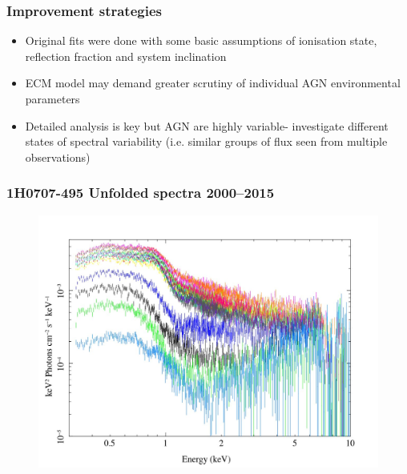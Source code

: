 \documentclass[]{beamer}
\begin{document}
\begin{frame}
\frametitle{Improvement strategies}
\begin{itemize}
    \item Original fits were done with some basic assumptions of ionisation state, reflection fraction and system inclination\pause
    \item ECM model may demand greater scrutiny of individual AGN environmental parameters\pause
    \item Detailed analysis is key but AGN are highly variable- investigate different states of spectral variability (i.e. similar groups of flux seen from multiple observations)
\end{itemize}
\end{frame}

\begin{frame}
\frametitle{1H0707-495 Unfolded spectra 2000--2015}
\begin{figure}\centering
\includegraphics[scale=.25]{1H0707-495_Unfolded_Spectra.jpeg}
\end{figure}
\end{frame}
\end{document}
